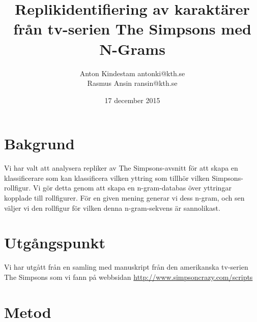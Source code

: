 \documentclass[a4paper]{article}
\author{Anton Kindestam antonki@kth.se\\Rasmus Ansin ransin@kth.se}
\title{Replikidentifiering av karaktärer från tv-serien The Simpsons med N-Grams}
\date{17 december 2015}
\begin{document}
\maketitle

\section{Bakgrund}
Vi har valt att analysera repliker av The Simpsons-avsnitt för att skapa en
klassificerare som kan klassificera vilken yttring som tillhör vilken
Simpsons-rollfigur. Vi gör detta genom att skapa en n-gram-databas över
yttringar kopplade till rollfigurer. För en given mening generar vi dess n-gram,
och sen väljer vi den rollfigur för vilken denna n-gram-sekvens är sannolikast.


\section{Utgångspunkt}

Vi har utgått från en samling med manuskript från den amerikanska
tv-serien The Simpsons som vi fann på webbsidan
\url{http://www.simpsoncrazy.com/scripts}

\section{Metod}
\end{document}
